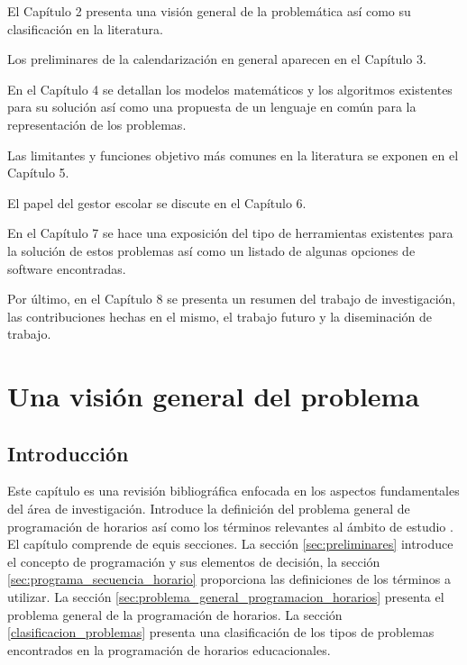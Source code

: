 \documentclass[draft,12pt,headsepline,footsepline,paper=letter]{scrreprt}
\begin{document}
El Capítulo 2 presenta una visión general de la problemática así como su clasificación en la literatura.

Los preliminares de la calendarización en general aparecen en el Capítulo 3.

En el Capítulo 4 se detallan los modelos matemáticos y los algoritmos existentes para su solución así como una propuesta de un lenguaje en común para la representación de los problemas.

Las limitantes y funciones objetivo más comunes en la literatura se exponen en el Capítulo 5.

El papel del gestor escolar se discute en el Capítulo 6.

En el Capítulo 7 se hace una exposición del tipo de herramientas existentes para la solución de estos problemas así como un listado de algunas opciones de software encontradas.

Por último, en el Capítulo 8 se presenta un resumen del trabajo de investigación, las contribuciones hechas en el mismo, el trabajo futuro y la diseminación de trabajo.

\chapter{Una visión general del problema}

\section{Introducción}

Este capítulo es una revisión bibliográfica enfocada en los aspectos fundamentales del área de investigación. Introduce la definición del problema general de programación de horarios así como los términos relevantes al ámbito de estudio \citep[p.~8]{abdullah06heuristic-approaches}.  
El capítulo comprende de equis secciones. La sección \ref{sec:preliminares} introduce el concepto de programación y sus elementos de decisión, la sección \ref{sec:programa_secuencia_horario} proporciona las definiciones de los términos a utilizar. La sección \ref{sec:problema_general_programacion_horarios} presenta el problema general de la programación de horarios. La sección \ref{clasificacion_problemas} presenta una clasificación de los tipos de problemas encontrados en la programación de horarios educacionales.
\end{document}
